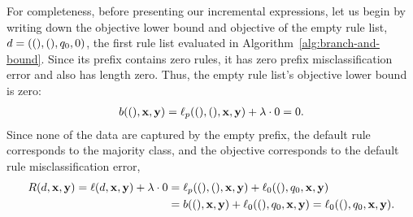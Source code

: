 \begin{arxiv}
For completeness, before presenting our incremental expressions,
let us begin by writing down the objective lower bound and objective
of the empty rule list, ${{d} = ((), (), q_0, 0)}$,
the first rule list evaluated in Algorithm~\ref{alg:branch-and-bound}.
%
Since its prefix contains zero rules, it has zero prefix
misclassification error and also has length zero.
%
Thus, the empty rule list's objective lower bound is zero:
\begin{align}
  b((), \x, \y) = \Loss_p((), (), \x, \y) + \Reg \cdot 0 = 0.
\end{align}
%
Since none of the data are captured by the empty prefix, the default rule
corresponds to the majority class, and the objective corresponds to the
default rule misclassification error, \ie
\begin{align}
  \Obj(\RL, \x, \y) = \Loss(\RL, \x, \y) + \Reg \cdot 0
  &= \Loss_p((), (), \x, \y) + \Loss_0((), \Default, \x, \y) \nn \\
  &= b((), \x, \y) + \Loss_0((), \Default, \x, \y) = \Loss_0((), \Default, \x, \y).
\end{align}


\end{arxiv}
